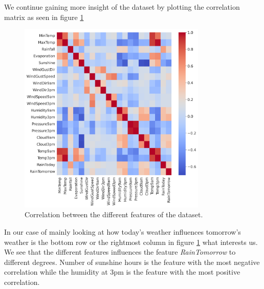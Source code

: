 \documentclass[11pt]{article}
\begin{document}
We continue gaining more insight of the dataset by plotting the correlation matrix as seen in figure \ref{fig:corr}
\begin{figure}[H]
    \centering
    \includegraphics[width=0.8\textwidth]{../figures/correlation_heatmap_full.png}
    \caption{Correlation between the different features of the dataset.}
    \label{fig:corr}
\end{figure}

In our case of mainly looking at how today's weather influences tomorrow's weather is the bottom row or the rightmost column in figure \ref{fig:corr} what interests us. We see that the different features influences the feature \textit{RainTomorrow} to different degrees. Number of sunshine hours is the feature with the most negative correlation while the humidity at 3pm is the feature with the most positive correlation.
\end{document}
